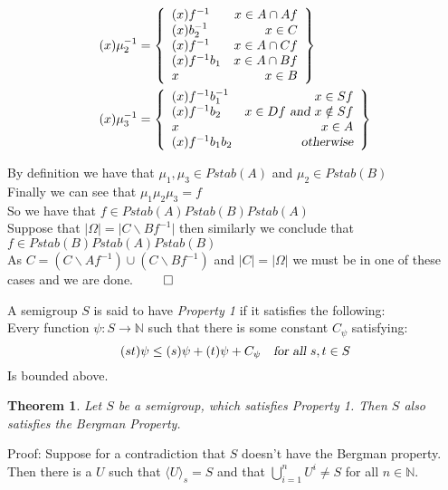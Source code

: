 \documentclass{report}
\newtheorem{theorem}{Theorem}[section]
\newenvironment{defn}[1][]{\refstepcounter{theorem}\begin{trivlist}
\item[\hskip \labelsep {\bfseries Definition  \thetheorem  \, \def\temp{#1}\ifx\temp\empty  #1\else  (#1)\fi
}]}   {\end{trivlist}}
\begin{document}
\begin{multicols}{2}
\begin{align*}
    (x)\mu_2^{-1}&=
 \left\{
    \begin{array}{lr}
      (x)f^{-1}&  x \in A\cap A f \\
            (x)b_2^{-1}&  x \in C\\
      (x)f^{-1}&  x \in A \cap Cf \\
      (x)f^{-1}b_1&  x \in A \cap Bf \\
      x&  x \in B
    \end{array}
    \right\}\\
    (x)\mu_3^{-1}&=
 \left\{
    \begin{array}{lr}
      (x)f^{-1}b_1^{-1}&  x \in Sf \\
                        (x)f^{-1}b_2& x \in Df \textsl{ and } x \notin Sf\\
      x&  x \in A\\
                  (x)f^{-1}b_1 b_2&  \textsl{otherwise}\\
    \end{array}
    \right\}
\end{align*}
\end{multicols}
By definition we have that $\mu_1,\mu_3 \in Pstab(A)$ and $\mu_2 \in Pstab(B)$\\
Finally we can see that $\mu_1\mu_2\mu_3 = f$\\
So we have that $f \in Pstab(A)Pstab(B)Pstab(A)$\\
Suppose that $\vert \Omega \vert=\vert C \backslash  Bf^{-1} \vert$ then  similarly we conclude that $f \in Pstab(B)Pstab(A)Pstab(B)$\\
As $C=(C \backslash  Af^{-1})\cup (C \backslash  Bf^{-1})$ and $\vert C \vert=\vert \Omega \vert$ we must be in one of these cases and we are done. $\qed$
\begin{defn}
A semigroup $S$ is said to have \textit{Property 1} if it satisfies the following:\\
Every function $\psi:S \rightarrow \mathbb{N}$ such that there is some constant  $C_\psi$ satisfying: $$(st)\psi \leq (s)\psi + (t)\psi + C_\psi \ \ \ \textsl{for all } s,t \in S$$ Is bounded above.
\end{defn}
\begin{theorem} \label{conditions}
Let $S$ be a semigroup, which satisfies Property 1. Then $S$ also satisfies the Bergman Property.
\end{theorem}\par
Proof: Suppose for a contradiction that $S$ doesn't have the Bergman property. Then there is a $U$ such that $\langle U \rangle_s = S$ and that $\bigcup_{i=1}^{n} U^i \neq S$ for all $n \in \mathbb{N}$.\\
\end{document}
